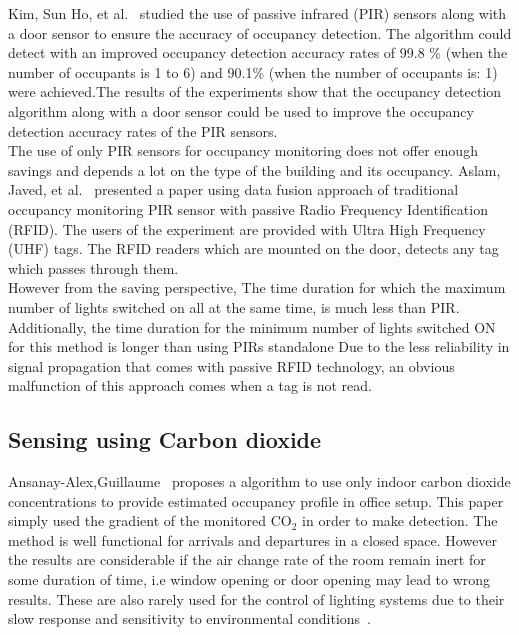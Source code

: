 Kim, Sun Ho, et al.~\cite{kim2017improved} studied the use of passive infrared (PIR) sensors along with a door sensor to ensure the accuracy of occupancy detection. The algorithm could detect with an improved occupancy detection accuracy rates of 99.8 \% (when the number of occupants is 1 to 6) and 90.1\% (when the number of occupants is: 1) were achieved.The results of the experiments show that the occupancy detection algorithm along with a door sensor could be used to improve the occupancy detection accuracy rates of
the PIR sensors.
\\
	


The use of only PIR sensors for occupancy monitoring does not offer enough savings and depends a lot on the type of the building and its occupancy. Aslam, Javed, et al.~\cite{manzoor2012occupancy} presented a paper using data fusion approach of traditional occupancy monitoring PIR sensor with passive Radio Frequency Identification (RFID).
The users of the experiment are provided with Ultra High Frequency (UHF) tags. The RFID readers which are mounted on the door, detects any tag which passes through them.
\\
However from the saving perspective, The time duration for which the maximum number of lights switched on all at the same time, is much less than PIR. Additionally, the time duration for the minimum number of lights switched ON for
this method is longer than using PIRs standalone 
Due to the less reliability in signal propagation that comes with passive RFID technology, an obvious malfunction of this approach comes when a tag is not read.
\\



\subsection{Sensing using Carbon dioxide}


Ansanay-Alex,Guillaume~\cite{ansanay2013estimating} proposes a algorithm to use only indoor carbon dioxide concentrations to provide estimated occupancy profile in office setup. This paper simply used the gradient of the monitored CO$_{2}$ in order to make detection. The method is well functional for arrivals and departures in a closed space. However the results are considerable if the air change rate of the room remain inert for some duration of time, i.e window opening or door opening may lead to wrong  results. These are also rarely used for the control of lighting systems due to their slow response and sensitivity to environmental conditions~\cite{teixeira2010survey}.
\\

